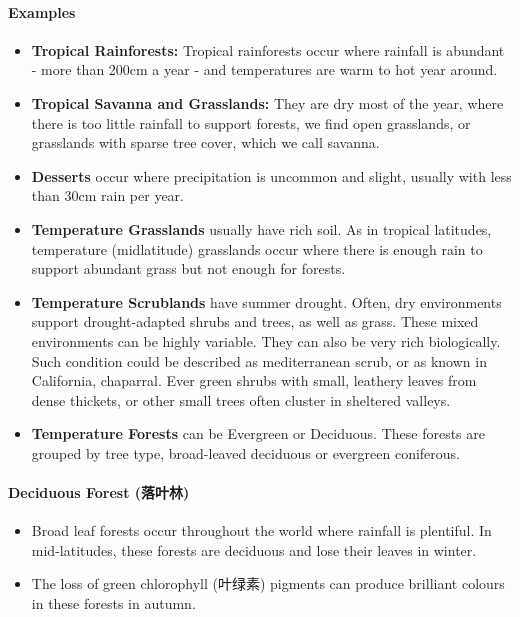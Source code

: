 \documentclass[10pt]{article}
\begin{document}
\paragraph{Examples}
\begin{itemize}
    \item \textbf{Tropical Rainforests:} Tropical rainforests occur where rainfall is abundant - more than 200cm a year - and temperatures are warm to hot year around.
    \item \textbf{Tropical Savanna and Grasslands:} They are dry most of the year, where there is too little rainfall to support forests, we find open grasslands, or grasslands with sparse tree cover, which we call savanna. 
    \item \textbf{Desserts} occur where precipitation is uncommon and slight, usually with less than 30cm rain per year. 
    \item \textbf{Temperature Grasslands} usually have rich soil. As in tropical latitudes, temperature (midlatitude) grasslands occur where there is enough rain to support abundant grass but not enough for forests. 
    \item \textbf{Temperature Scrublands} have summer drought. Often, dry environments support drought-adapted shrubs and trees, as well as grass. These mixed environments can be highly variable. They can also be very rich biologically. Such condition could be described as mediterranean scrub, or as known in California, chaparral. Ever green shrubs with small, leathery leaves from dense thickets, or other small trees often cluster in sheltered valleys. 
    \item \textbf{Temperature Forests} can be Evergreen or Deciduous. These forests are grouped by tree type, broad-leaved deciduous or evergreen coniferous. 
\end{itemize}

\paragraph{Deciduous Forest (落叶林)}
\begin{itemize}
    \item Broad leaf forests occur throughout the world where rainfall is plentiful. In mid-latitudes, these forests are deciduous and lose their leaves in winter. 
    \item The loss of green chlorophyll (叶绿素) pigments can produce brilliant colours in these forests in autumn. 
\end{itemize}
\end{document}
